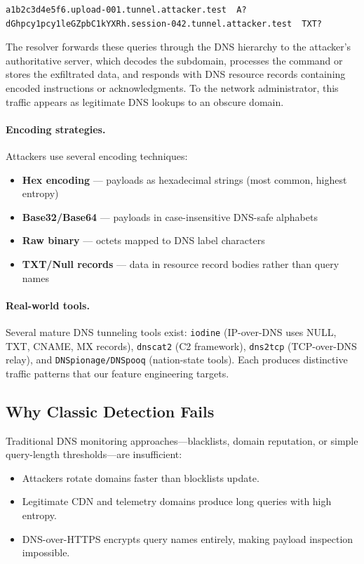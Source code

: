 \documentclass[12pt,a4paper]{article}
\begin{document}
\begin{lstlisting}
a1b2c3d4e5f6.upload-001.tunnel.attacker.test  A?
dGhpcy1pcy1leGZpbC1kYXRh.session-042.tunnel.attacker.test  TXT?
\end{lstlisting}

The resolver forwards these queries through the DNS hierarchy to the attacker's authoritative server, which decodes the subdomain, processes the command or stores the exfiltrated data, and responds with DNS resource records containing encoded instructions or acknowledgments. To the network administrator, this traffic appears as legitimate DNS lookups to an obscure domain.

\paragraph{Encoding strategies.}
Attackers use several encoding techniques:
\begin{itemize}
    \item \textbf{Hex encoding} --- payloads as hexadecimal strings (most common, highest entropy)
    \item \textbf{Base32/Base64} --- payloads in case-insensitive DNS-safe alphabets
    \item \textbf{Raw binary} --- octets mapped to DNS label characters
    \item \textbf{TXT/Null records} --- data in resource record bodies rather than query names
\end{itemize}

\paragraph{Real-world tools.}
Several mature DNS tunneling tools exist: \texttt{iodine} (IP-over-DNS uses NULL, TXT, CNAME, MX records), \texttt{dnscat2} (C2 framework), \texttt{dns2tcp} (TCP-over-DNS relay), and \texttt{DNSpionage/DNSpooq} (nation-state tools). Each produces distinctive traffic patterns that our feature engineering targets.

\subsection{Why Classic Detection Fails}

Traditional DNS monitoring approaches---blacklists, domain reputation, or simple query-length thresholds---are insufficient:
\begin{itemize}
    \item Attackers rotate domains faster than blocklists update.
    \item Legitimate CDN and telemetry domains produce long queries with high entropy.
    \item DNS-over-HTTPS encrypts query names entirely, making payload inspection impossible.
\end{itemize}
\end{document}
